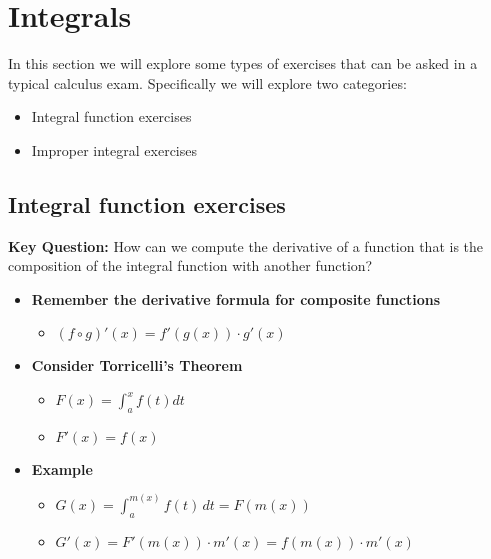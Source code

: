 \section{Integrals}

In this section we will explore some types of exercises that can be asked in a typical calculus exam. Specifically we will explore two categories:

\begin{itemize}
	\item Integral function exercises
	\item Improper integral exercises
\end{itemize}

\subsection{Integral function exercises}

\begin{cascade}
	\textbf{Key Question:} How can we compute the derivative of a function that is the composition of the integral function with another function?
	\begin{itemize}
		\item \textbf{Remember the derivative formula for composite functions}
		      \begin{itemize}
			      \item $(f \circ g)'(x) = f'(g(x)) \cdot g'(x)$
		      \end{itemize}
		\item \textbf{Consider Torricelli's Theorem}
		      \begin{itemize}
			      \item $F(x) = \int_a^x f(t) dt$
			      \item $F'(x) = f(x)$
		      \end{itemize}
		\item \textbf{Example}
		      \begin{itemize}
			      \item $G(x) = \int_a^{m(x)} f(t)\,dt = F(m(x))$
			      \item $G'(x) = F'(m(x)) \cdot m'(x) = f(m(x)) \cdot m'(x)$
		      \end{itemize}
	\end{itemize}
\end{cascade}

\hfill

